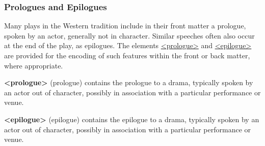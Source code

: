 \subsubsection[{Prologues and Epilogues}]{Prologues and Epilogues}\label{DRPRO}\par
Many plays in the Western tradition include in their front matter a prologue, spoken by an actor, generally not in character. Similar speeches often also occur at the end of the play, as epilogues. The elements \hyperref[TEI.prologue]{<prologue>} and \hyperref[TEI.epilogue]{<epilogue>} are provided for the encoding of such features within the front or back matter, where appropriate. 
\begin{sansreflist}
  
\item [\textbf{<prologue>}] (prologue) contains the prologue to a drama, typically spoken by an actor out of character, possibly in association with a particular performance or venue.
\item [\textbf{<epilogue>}] (epilogue) contains the epilogue to a drama, typically spoken by an actor out of character, possibly in association with a particular performance or venue.
\end{sansreflist}
